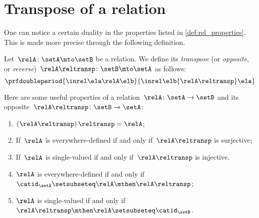 \section{Transpose of a relation}

One can notice a certain duality in the properties listed in \cref{def:rel_properties}.
This is made more precise through the following definition.

\begin{ctdefinition}
    \label{def:relation-transpose}
    Let~$\relA\colon \setA\mto \setB$ be a relation.
    We define its \emph{transpose} (or \emph{opposite}, or \emph{reverse})~$\relA\reltransp\colon \setB \mto \setA$ as follows:
    \begin{equation*}
        \prfdoubleperiod{
            \inrel \ela \relA \elb
        }{
            \inrel \elb {\relA\reltransp} \ela
        }
    \end{equation*}
\end{ctdefinition}
\begin{remark}
    \label{re:rel-op-properties}
    Here are some useful properties of a relation~$\relA\colon \setA\to \setB$  and its opposite~$\relA\reltransp\colon \setB\to \setA$:
    \begin{enumerate}
        \item $\left(\relA\reltransp\right)\reltransp = \relA $;
        \item If~$\relA$ is everywhere-defined if and only if~$\relA\reltransp$ is surjective;
        \item If~$\relA$ is single-valued if and only if~$\relA\reltransp$ is injective.
        \item $\relA$ is everywhere-defined if and only if~$\catid_\setA\setsubseteq \relA \mthen \relA\reltransp$;
        \item $\relA$ is single-valued if and only if~$\relA\reltransp\mthen \relA\setsubseteq \catid_\setB$.
    \end{enumerate}
\end{remark}

\begin{marginfigure}
    \centering
    \caption{}
    \label{fig:rel_transpose}
\end{marginfigure}

\begin{marginfigure}
    \centering
    \caption{}
    \label{fig:rel_transpose_bis}
\end{marginfigure}

